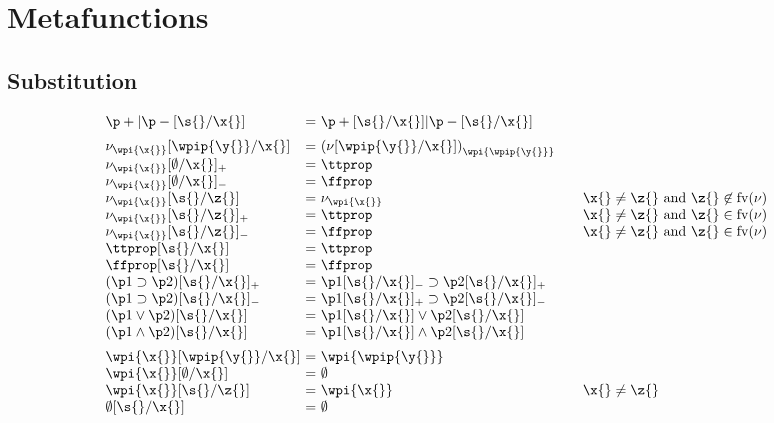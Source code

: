 \documentclass{article}[12pt]
\begin{document}
\newpage

\section{Metafunctions}

\subsection{Substitution}

\newcommand{\sxo}[1]{\subs{#1}{\s{}}{\x{}}}
\newcommand{\sxom}[1]{\subsminus{#1}{\s{}}{\x{}}}
\newcommand{\sxop}[1]{\subsplus{#1}{\s{}}{\x{}}}

$$
  \begin{array}{l@{\ =\ }l@{\qquad}l}
  \sxo{\p+|\p-} & \sxo{\p+}|\sxo{\p-} & \vspace{2mm}\\


  \subs{\nu_{\wpi{\x{}}}}{\wpip{\y{}}}{\x{}} & {(\subs{\nu}{\wpip{\y{}}}{\x{}})}_{\wpi{\wpip{\y{}}}} & \\
  \subsplus{\nu_{\wpi{\x{}}}}{\noobj}{\x{}} & \topprop & \\
  \subsminus{\nu_{\wpi{\x{}}}}{\noobj}{\x{}} & \botprop & \\
  \subs{\nu_{\wpi{\x{}}}}{\s{}}{\z{}} & {{\nu}_{\wpi{\x{}}}} & \x{}
  \neq \z{} \text { and } \z{} \not\in \fv{\nu}\\
  \subsplus{\nu_{\wpi{\x{}}}}{\s{}}{\z{}} & \topprop & \x{}
  \neq \z{} \text { and } \z{} \in \fv{\nu}\\
  \subsminus{\nu_{\wpi{\x{}}}}{\s{}}{\z{}} & \botprop & \x{}
  \neq \z{} \text { and } \z{} \in \fv{\nu}\\
  \sxo{\topprop} & \topprop & \\
  \sxo{\botprop} & \botprop & \\
  \sxop{(\imp{\p1}{\p2})} & \imp{\sxom{\p1}}{\sxop{\p2}}& \\
  \sxom{(\imp{\p1}{\p2})} & \imp{\sxop{\p1}}{\sxom{\p2}}& \\
  \sxo{({\p1}\vee{\p2})} & {\sxo{\p1}}\vee{\sxo{\p2}}& \\
  \sxo{({\p1}\wedge{\p2})} & {\sxo{\p1}}\wedge{\sxo{\p2}}&
  \vspace{2mm}\\

  \subs{\wpi{\x{}}}{\wpip{\y{}}}{\x{}} & \wpi{\wpip{\y{}}}& \\
  \subs{\wpi{\x{}}}{\noobj}{\x{}} & \noobj & \\
  \subs{\wpi{\x{}}}{\s{}}{\z{}} & \wpi{{\x{}}}& \x{} \neq \z{}\\
  \sxo{\noobj} & \noobj \\
  \end{array}
$$
\end{document}
